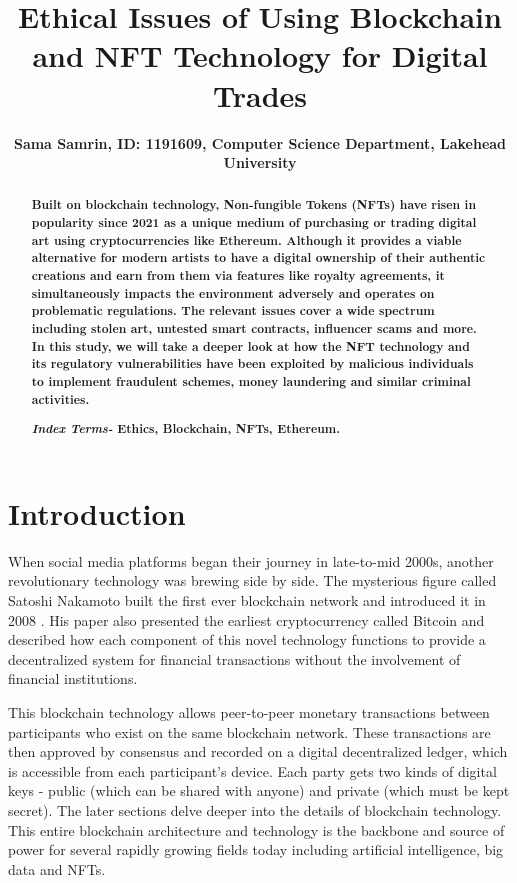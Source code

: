 \documentclass[12pt]{article}
\title{Ethical Issues of Using Blockchain and NFT Technology for Digital Trades}
\author{\textbf{Sama Samrin, ID: 1191609, Computer Science Department, Lakehead University} 
}
\date{}
\begin{document}
\maketitle
\begin{abstract}
{\color{blue}\textbf{ Built on blockchain technology, Non-fungible Tokens (NFTs) have risen in popularity since 2021 as a unique medium of purchasing or trading digital art using cryptocurrencies like Ethereum. Although it provides a viable alternative for modern artists to have a digital ownership of their authentic creations and earn from them via features like royalty agreements, it simultaneously impacts the environment adversely and operates on problematic regulations. The relevant issues cover a wide spectrum including stolen art, untested smart contracts, influencer scams and more. In this study, we will take a deeper look at how the NFT technology and its regulatory vulnerabilities have been exploited by malicious individuals to implement fraudulent schemes, money laundering and similar criminal activities.}  }

\textbf{\emph{Index Terms-} Ethics, Blockchain, NFTs, Ethereum.}
\end{abstract}


\section{Introduction}

When social media platforms began their journey in late-to-mid 2000s, another revolutionary technology was brewing side by side. The mysterious figure called Satoshi Nakamoto built the first ever blockchain network and introduced it in 2008 \cite{nakamoto2008bitcoin}. His paper also presented the earliest cryptocurrency called Bitcoin and described how each component of this novel technology functions to provide a decentralized system for financial transactions without the involvement of financial institutions. 


{\color{blue}
This blockchain technology allows peer-to-peer monetary transactions between participants who exist on the same blockchain network. These transactions are then approved by consensus and recorded on a digital decentralized ledger, which is accessible from each participant’s device. Each party gets two kinds of digital keys - public (which can be shared with anyone) and private (which must be kept secret).} The later sections delve deeper into the details of blockchain technology. This entire blockchain architecture and technology is the backbone and source of power for several rapidly growing fields today including artificial intelligence, big data \cite{modanimethodological} and NFTs.
\end{document}
